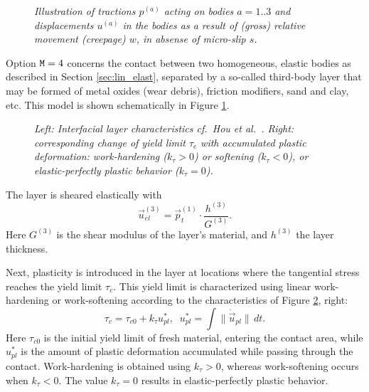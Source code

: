 \documentclass[12pt]{report}
\begin{document}
\begin{figure}[bt]
\centering
{}
\caption{\em Illustration of tractions $p^{(a)}$ acting on bodies $a=1..3$
        and displacements $u^{(a)}$ in the bodies as a result of (gross)
        relative movement (creepage) $w$, in absense of micro-slip $s$.}
\label{fig:intfc_layer}
\end{figure}

Option ${\tt M}=4$ concerns the contact between two homogeneous, elastic
bodies as described in Section \ref{sec:lin_elast}, separated by a
so-called third-body layer that may be formed of metal oxides (wear
debris), friction modifiers, sand and clay, etc. This model is shown
schematically in Figure \ref{fig:intfc_layer}.

\begin{figure}[bt]
\centering
{}
\caption{\em Left: Interfacial layer characteristics cf.\ Hou et al.\ 
        \cite{Hou1997}. Right: corresponding change of yield limit
        $\tau_c$ with accumulated plastic deformation: work-hardening
        ($k_\tau>0$) or softening ($k_\tau<0$), or elastic-perfectly
        plastic behavior ($k_\tau=0$).}
\label{fig:hou_schm}
\end{figure}

The layer is sheared elastically with
\begin{equation}
   \vec{u}_{el}^{(3)} = \vec{p}_t^{(1)} \cdot \frac{h^{(3)} }{ G^{(3)} } .
\end{equation}
Here $G^{(3)}$ is the shear modulus of the layer's material, and $h^{(3)}$
the layer thickness. 

Next, plasticity is introduced in the layer at locations where the tangential
stress reaches the yield limit $\tau_c$. This yield limit is characterized
using linear work-hardening or work-softening according to the
characteristics of Figure \ref{fig:hou_schm}, right:
\begin{equation}
        \tau_c = \tau_{c0} + k_\tau u^*_{pl} , \;\;
        u^*_{pl} = \int \| \dot{\vec{u}}_{pl} \| \,dt .
\end{equation}
Here $\tau_{c0}$ is the initial yield limit of fresh material, entering the
contact area, while $u^*_{pl}$ is the amount of plastic deformation
accumulated while passing through the contact. Work-hardening is obtained
using $k_\tau>0$, whereas work-softening occurs when $k_\tau<0$. The value
$k_\tau=0$ results in elastic-perfectly plastic behavior.
\end{document}
